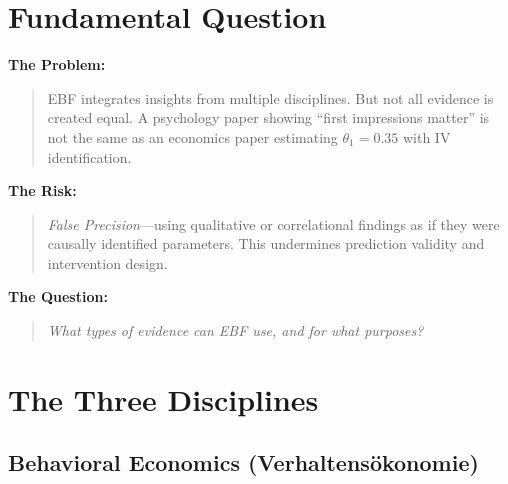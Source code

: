 \documentclass[11pt, a4paper]{article}
\begin{document}
\section{Fundamental Question}
\label{sec:evd-question}

\begin{tcolorbox}[colback=orange!5!white, colframe=orange!75!black,
    title=The Evidence Question]

\textbf{The Problem:}
\begin{quote}
EBF integrates insights from multiple disciplines. But not all evidence is created equal. A psychology paper showing ``first impressions matter'' is not the same as an economics paper estimating $\theta_1 = 0.35$ with IV identification.
\end{quote}

\textbf{The Risk:}
\begin{quote}
\textit{False Precision}---using qualitative or correlational findings as if they were causally identified parameters. This undermines prediction validity and intervention design.
\end{quote}

\textbf{The Question:}
\begin{quote}
\textit{What types of evidence can EBF use, and for what purposes?}
\end{quote}

\end{tcolorbox}


\section{The Three Disciplines}
\label{sec:evd-disciplines}

\subsection{Behavioral Economics (Verhaltensökonomie)}
\end{document}
